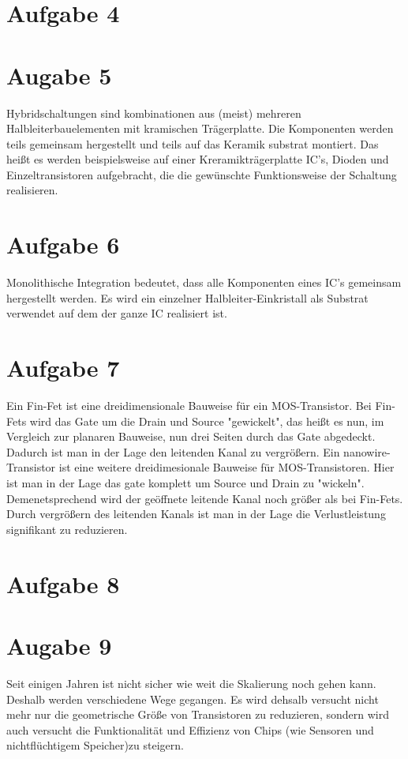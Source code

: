 \documentclass[a4paper]{scrartcl}
\begin{document}
\section*{Aufgabe 4}



\section*{Augabe 5}
Hybridschaltungen sind kombinationen aus (meist) mehreren Halbleiterbauelementen mit kramischen Trägerplatte. Die Komponenten werden teils gemeinsam hergestellt und teils auf das Keramik substrat montiert. Das heißt es werden beispielsweise auf einer Kreramikträgerplatte IC's, Dioden und Einzeltransistoren aufgebracht, die die gewünschte Funktionsweise der Schaltung realisieren.


\section*{Aufgabe 6}
Monolithische Integration bedeutet, dass alle Komponenten eines IC's gemeinsam hergestellt werden. Es wird ein einzelner Halbleiter-Einkristall als Substrat verwendet auf dem der ganze IC realisiert ist.


\section*{Aufgabe 7}
Ein Fin-Fet ist eine dreidimensionale Bauweise für ein MOS-Transistor. Bei Fin-Fets wird das Gate um die Drain und Source "gewickelt", das heißt es nun, im Vergleich zur planaren Bauweise, nun drei Seiten durch das Gate abgedeckt. Dadurch ist man in der Lage den leitenden Kanal zu vergrößern.
Ein nanowire-Transistor ist eine weitere dreidimesionale Bauweise für MOS-Transistoren. Hier ist man in der Lage das gate komplett um Source und Drain zu "wickeln". Demenetsprechend wird der geöffnete leitende Kanal noch größer als bei Fin-Fets. Durch vergrößern des leitenden Kanals ist man in der Lage die Verlustleistung signifikant zu reduzieren.


\section*{Aufgabe 8}



\section*{Augabe 9}
Seit einigen Jahren ist nicht sicher wie weit die Skalierung noch gehen kann. Deshalb werden verschiedene Wege gegangen. Es wird dehsalb versucht nicht mehr nur die geometrische Größe von Transistoren zu reduzieren, sondern wird auch versucht die Funktionalität und Effizienz von Chips (wie Sensoren und nichtflüchtigem Speicher)zu steigern.
\end{document}
